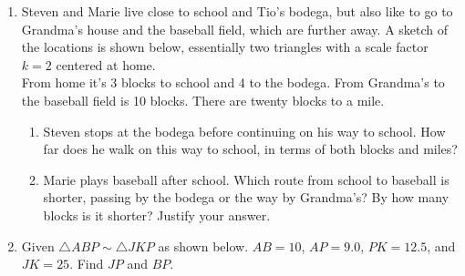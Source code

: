 \documentclass[12pt, twoside]{article}
\begin{document}
\begin{enumerate}
\newpage
\item Steven and Marie live close to school and Tio's bodega, but also like to go to Grandma's house and the baseball field, which are further away. A sketch of the locations is shown below, essentially two triangles with a scale factor $k=2$ centered at home.\\[0.25cm]
From home it's 3 blocks to school and 4 to the bodega. From Grandma's to the baseball field is 10 blocks. There are twenty blocks to a mile.
\begin{enumerate}
    \item Steven stops at the bodega before continuing on his way to school. How far does he walk on this way to school, in terms of both blocks and miles?
        \begin{flushright}
        \end{flushright} 
    \item Marie plays baseball after school. Which route from school to baseball is shorter, passing by the bodega or the way by Grandma's? By how many blocks is it shorter? Justify your answer.
\end{enumerate} \vspace{4cm}

\item Given $\triangle ABP \sim \triangle JKP$ as shown below. $AB=10$, $AP=9.0$, $PK=12.5$, and $JK=25$. Find $JP$ and $BP$.
  \begin{flushright}
    \end{flushright}


\end{enumerate}
\end{document}
